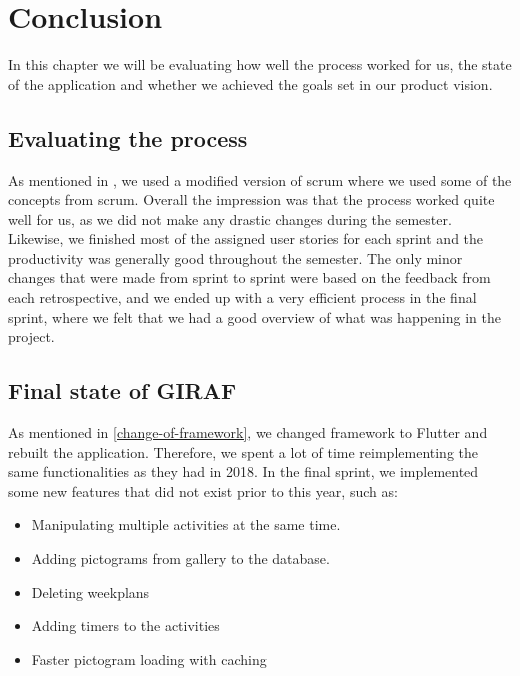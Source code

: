 \chapter{Conclusion}
In this chapter we will be evaluating how well the process worked for us, the state of the application and whether we achieved the goals set in our product vision.

\section{Evaluating the process}
As mentioned in , we used a modified version of scrum where we used some of the concepts from scrum.
Overall the impression was that the process worked quite well for us, as we did not make any drastic changes during the semester.
Likewise, we finished most of the assigned user stories for each sprint and the productivity was generally good throughout the semester.
The only minor changes that were made from sprint to sprint were based on the feedback from each retrospective, and we ended up with a very efficient process in the final sprint, where we felt that we had a good overview of what was happening in the project.

\section{Final state of GIRAF}
As mentioned in \autoref{change-of-framework}, we changed framework to Flutter and rebuilt the application.
Therefore, we spent a lot of time reimplementing the same functionalities as they had in 2018. In the final sprint, we implemented some new features that did not exist prior to this year, such as:
\begin{itemize}
    \item Manipulating multiple activities at the same time.
    \item Adding pictograms from gallery to the database.
    \item Deleting weekplans
    \item Adding timers to the activities
    \item Faster pictogram loading with caching
\end{itemize}

